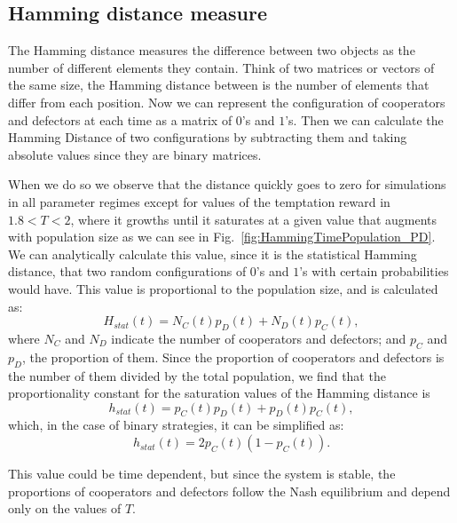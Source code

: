 \subsection{Hamming distance measure}


The Hamming distance measures the difference between two objects as the number of different elements they contain. Think of two matrices or vectors of the same size, the Hamming distance between is the number of elements that differ from each position. Now we can represent the configuration of cooperators and defectors at each time as a matrix of $0$'s and $1$'s. Then we can calculate the Hamming Distance of two configurations by subtracting them and taking absolute values since they are binary matrices.

When we do so we observe that the distance quickly goes to zero for simulations in all parameter regimes except for values of the temptation reward in $1.8 < T < 2$, where it growths until it saturates at a given value that augments with population size as we can see in Fig.~\ref{fig:HammingTimePopulation_PD}. We can analytically calculate this value, since it is the statistical Hamming distance, that two random configurations of $0$'s and $1$'s with certain probabilities would have. This value is proportional to the population size, and is calculated as:
\begin{equation}
H_{stat}(t)=N_C(t)p_D(t)+N_D(t)p_C(t),
\end{equation} 
where $N_C$ and $N_D$ indicate the number of cooperators and defectors; and $p_C$ and $p_D$, the proportion of them. Since the proportion of cooperators and defectors is the number of them divided by the total population, we find that the 
proportionality constant for the saturation values of the Hamming distance is
\begin{equation}
h_{stat}(t)=p_C(t)p_D(t)+p_D(t)p_C(t),
\end{equation} 
which, in the case of binary strategies, it can be simplified as:
\begin{equation}
h_{stat}(t)=2p_C(t)(1-p_C(t)).
\end{equation} 

This value could be time dependent, but since the system is stable, the proportions of cooperators and defectors follow the Nash equilibrium and depend only on the values of $T$.



